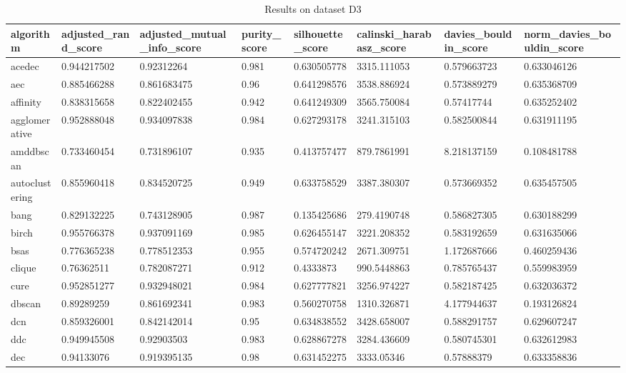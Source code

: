 \begin{table}[H]
\centering
\caption{Results on dataset D3}
\label{S56_Table}
\begin{tabular}{|l|l|l|l|l|l|l|l|}
\hline
algorithm & adjusted\_rand\_score & adjusted\_mutual\_info\_score & purity\_score & silhouette\_score & calinski\_harabasz\_score & davies\_bouldin\_score & norm\_davies\_bouldin\_score \\
\hline
acedec & 0.944217502 & 0.92312264 & 0.981 & 0.630505778 & 3315.111053 & 0.579663723 & 0.633046126 \\
\hline
aec & 0.885466288 & 0.861683475 & 0.96 & 0.641298576 & 3538.886924 & 0.573889279 & 0.635368709 \\
\hline
affinity & 0.838315658 & 0.822402455 & 0.942 & 0.641249309 & 3565.750084 & 0.57417744 & 0.635252402 \\
\hline
agglomerative & 0.952888048 & 0.934097838 & 0.984 & 0.627293178 & 3241.315103 & 0.582500844 & 0.631911195 \\
\hline
amddbscan & 0.733460454 & 0.731896107 & 0.935 & 0.413757477 & 879.7861991 & 8.218137159 & 0.108481788 \\
\hline
autoclustering & 0.855960418 & 0.834520725 & 0.949 & 0.633758529 & 3387.380307 & 0.573669352 & 0.635457505 \\
\hline
bang & 0.829132225 & 0.743128905 & 0.987 & 0.135425686 & 279.4190748 & 0.586827305 & 0.630188299 \\
\hline
birch & 0.955766378 & 0.937091169 & 0.985 & 0.626455147 & 3221.208352 & 0.583192659 & 0.631635066 \\
\hline
bsas & 0.776365238 & 0.778512353 & 0.955 & 0.574720242 & 2671.309751 & 1.172687666 & 0.460259436 \\
\hline
clique & 0.76362511 & 0.782087271 & 0.912 & 0.4333873 & 990.5448863 & 0.785765437 & 0.559983959 \\
\hline
cure & 0.952851277 & 0.932948021 & 0.984 & 0.627777821 & 3256.974227 & 0.582187425 & 0.632036372 \\
\hline
dbscan & 0.89289259 & 0.861692341 & 0.983 & 0.560270758 & 1310.326871 & 4.177944637 & 0.193126824 \\
\hline
dcn & 0.859326001 & 0.842142014 & 0.95 & 0.634838552 & 3428.658007 & 0.588291757 & 0.629607247 \\
\hline
ddc & 0.949945508 & 0.92903503 & 0.983 & 0.628867278 & 3284.436609 & 0.580745301 & 0.632612983 \\
\hline
dec & 0.94133076 & 0.919395135 & 0.98 & 0.631452275 & 3333.05346 & 0.57888379 & 0.633358836 \\

\end{tabular}
\end{table}
